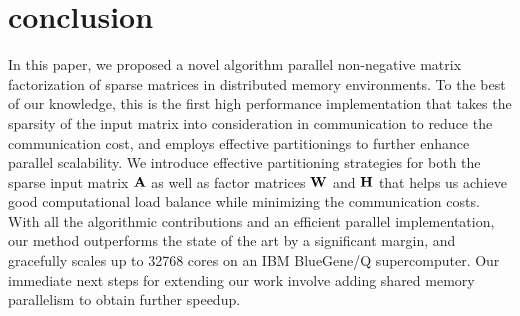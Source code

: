 \section{conclusion}

In this paper, we proposed a novel algorithm parallel non-negative matrix factorization of sparse matrices in distributed memory environments.
To the best of our knowledge, this is the first high performance implementation that takes the sparsity of the input matrix into consideration in communication to reduce the communication cost, and employs effective partitionings to further enhance parallel scalability.
We introduce effective partitioning strategies for both the sparse input matrix $\mathbf{A}$ as well as factor matrices $\mathbf{W}$ and $\mathbf{H}$ that helps us achieve good computational load balance while minimizing the communication costs.
With all the algorithmic contributions and an efficient parallel implementation, our method outperforms the state of the art by a significant margin, and gracefully scales up to 32768 cores on an IBM BlueGene/Q supercomputer.
Our immediate next steps for extending our work involve adding shared memory parallelism to obtain further speedup.
